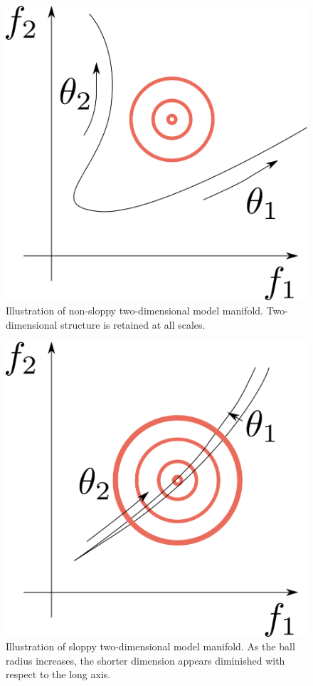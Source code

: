 \documentclass[11pt]{article}
\begin{document}
\begin{figure}[htbp]
  \centering
  \includegraphics[width=\linewidth]{../model-manifold/non-sloppy-illustration}
  \caption{Illustration of non-sloppy two-dimensional model
    manifold. Two-dimensional structure is retained at all scales.}
\end{figure}

\begin{figure}[htbp]
  \centering
  \includegraphics[width=\linewidth]{../model-manifold/sloppy-illustration}
  \caption{Illustration of sloppy two-dimensional model manifold. As
    the ball radius increases, the shorter dimension appears
    diminished with respect to the long axis.}
\end{figure}
\end{document}
